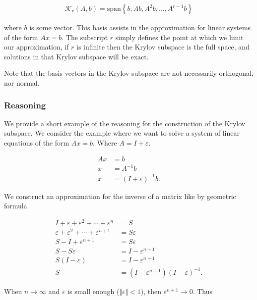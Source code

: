 \documentclass[../fem.tex]{subfiles}
\begin{document}

\begin{align*}
  \mathcal{K}_r\left(A,b\right)=\text{span}\left\{b,Ab,A^2b,\ldots,A^{r-1}b\right\}
\end{align*}

where $b$ is some vector. This basis assists in the approximation for linear
systems of the form $Ax=b$. The subscript $r$ simply defines the point at which
we limit our approximation, if $r$ is infinite then the Krylov subspace is the
full space, and solutions in that Krylov subspace will be exact.

Note that the basis vectors in the Krylov subspace are not necessarily
orthogonal, nor normal.

\subsubsection{Reasoning}%
\label{ssub:reasoning}

We provide a short example of the reasoning for the construction of the Krylov
subspace. We consider the example where we want to solve a system of linear
equations of the form $Ax=b$. Where $A=I+\varepsilon$.

\begin{align*}
  Ax&=b\\
  x&=A^{-1}b\\
  x&=(I+\varepsilon)^{-1}b.
\end{align*}

We construct an approximation for the inverse of a matrix like by geometric
formula

\begin{align*}
  I+\varepsilon+\varepsilon^2+\cdots+\varepsilon^n&=S\\
  \varepsilon+\varepsilon^2+\cdots+\varepsilon^{n+1}&=S\varepsilon\\
  S-I+\varepsilon^{n+1}&=S\varepsilon\\
  S-S\varepsilon&=I-\varepsilon^{n+1}\\
  S(I-\varepsilon)&=I-\varepsilon^{n+1}\\
  S&=\left(I-\varepsilon^{n+1}\right)\left(I-\varepsilon\right)^{-1}.
\end{align*}

When $n\rightarrow \infty$ and $\varepsilon$ is small enough
($\Vert\varepsilon\Vert < 1$), then $\varepsilon^{n+1}\rightarrow 0$. Thus
\end{document}
